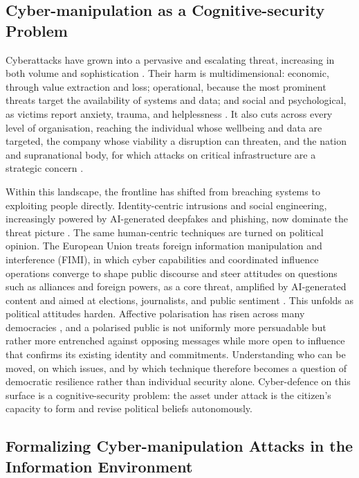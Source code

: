 \documentclass[11pt,a4paper]{article}
\begin{document}
\subsection{Cyber-manipulation as a Cognitive-security Problem}

Cyberattacks have grown into a pervasive and escalating threat, increasing in both
volume and sophistication \citep{councileu2025cyber,liliu2021comprehensive}. Their harm
is multidimensional: economic, through value extraction and loss; operational, because
the most prominent threats target the availability of systems and data; and social and
psychological, as victims report anxiety, trauma, and helplessness
\citep{bada2020social,councileu2025cyber}. It also cuts across every level of
organisation, reaching the individual whose wellbeing and data are targeted, the
company whose viability a disruption can threaten, and the nation and supranational body,
for which attacks on critical infrastructure are a strategic concern
\citep{bada2020social,ryan2025impact}.

Within this landscape, the frontline has shifted from breaching systems to exploiting
people directly. Identity-centric intrusions and social engineering, increasingly
powered by AI-generated deepfakes and phishing, now dominate the threat picture
\citep{bada2020social,inkster2023cybersecurity,mcconkey2026annual}. The same
human-centric techniques are turned on political opinion. The European Union treats
foreign information manipulation and interference (FIMI), in which cyber capabilities
and coordinated influence operations converge to shape public discourse and steer
attitudes on questions such as alliances and foreign powers, as a core threat, amplified
by AI-generated content and aimed at elections, journalists, and public sentiment
\citep{enisa2023elections,enisaeeas2022fimi}. This unfolds as political attitudes harden.
Affective polarisation has risen across many democracies \citep{reiljan2020fear}, and a
polarised public is not uniformly more persuadable but rather more entrenched against
opposing messages while more open to influence that confirms its existing identity and
commitments. Understanding who can be moved, on which issues, and by which technique
therefore becomes a question of democratic resilience rather than individual security
alone. Cyber-defence on this surface is a cognitive-security problem: the asset under
attack is the citizen's capacity to form and revise political beliefs autonomously.

\subsection{Formalizing Cyber-manipulation Attacks in the Information Environment}
\end{document}

